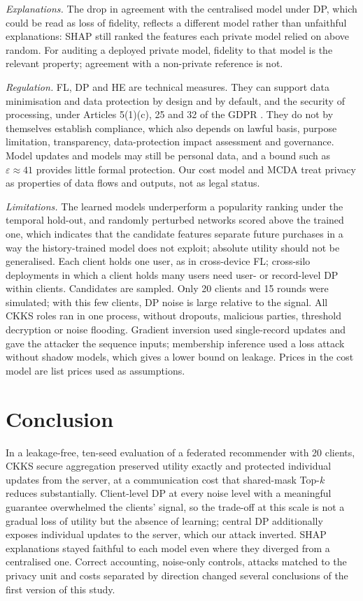 \documentclass[11pt,a4paper]{article}
\begin{document}
\textit{Explanations.} The drop in agreement with the centralised model under DP, which could be read as loss of fidelity, reflects a different model rather than unfaithful explanations: SHAP still ranked the features each private model relied on above random. For auditing a deployed private model, fidelity to that model is the relevant property; agreement with a non-private reference is not.

\textit{Regulation.} FL, DP and HE are technical measures. They can support data minimisation and data protection by design and by default, and the security of processing, under Articles 5(1)(c), 25 and 32 of the GDPR \cite{gdpr2016}. They do not by themselves establish compliance, which also depends on lawful basis, purpose limitation, transparency, data-protection impact assessment and governance. Model updates and models may still be personal data, and a bound such as $\varepsilon\approx41$ provides little formal protection. Our cost model and MCDA treat privacy as properties of data flows and outputs, not as legal status.

\textit{Limitations.} The learned models underperform a popularity ranking under the temporal hold-out, and randomly perturbed networks scored above the trained one, which indicates that the candidate features separate future purchases in a way the history-trained model does not exploit; absolute utility should not be generalised. Each client holds one user, as in cross-device FL; cross-silo deployments in which a client holds many users need user- or record-level DP within clients. Candidates are sampled. Only 20 clients and 15 rounds were simulated; with this few clients, DP noise is large relative to the signal. All CKKS roles ran in one process, without dropouts, malicious parties, threshold decryption or noise flooding. Gradient inversion used single-record updates and gave the attacker the sequence inputs; membership inference used a loss attack without shadow models, which gives a lower bound on leakage. Prices in the cost model are list prices used as assumptions.

\section{Conclusion}

In a leakage-free, ten-seed evaluation of a federated recommender with 20 clients, CKKS secure aggregation preserved utility exactly and protected individual updates from the server, at a communication cost that shared-mask Top-$k$ reduces substantially. Client-level DP at every noise level with a meaningful guarantee overwhelmed the clients' signal, so the trade-off at this scale is not a gradual loss of utility but the absence of learning; central DP additionally exposes individual updates to the server, which our attack inverted. SHAP explanations stayed faithful to each model even where they diverged from a centralised one. Correct accounting, noise-only controls, attacks matched to the privacy unit and costs separated by direction changed several conclusions of the first version of this study.
\end{document}
